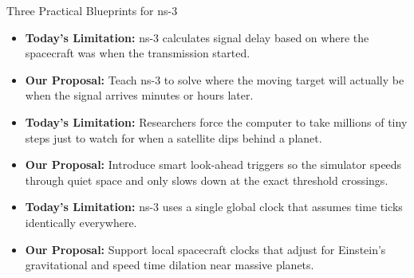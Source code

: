 \documentclass[aspectratio=169,10pt]{beamer}
\begin{document}
\begin{frame}{Three Practical Blueprints for ns-3}
  \begin{tcolorbox}[colback=cardBg,colframe=spaceNavy,title=\textbf{Blueprint 1: Aim Where the Spacecraft Will Be (In-Flight Light Solver)},top=1.5pt,bottom=1.5pt]
    \small
    \begin{itemize}\setlength{\itemsep}{0.8pt}
      \item \textbf{Today's Limitation:} ns-3 calculates signal delay based on where the spacecraft was when the transmission started.
      \item \textbf{Our Proposal:} Teach ns-3 to solve where the moving target will actually be when the signal arrives minutes or hours later.
    \end{itemize}
  \end{tcolorbox}

  \vspace{1.5pt}
  \begin{tcolorbox}[colback=lightCyan,colframe=electricCyan!80!black,title=\textbf{Blueprint 2: Smart Early-Warning Alarms (Boundary Event Guarding)},top=1.5pt,bottom=1.5pt]
    \small
    \begin{itemize}\setlength{\itemsep}{0.8pt}
      \item \textbf{Today's Limitation:} Researchers force the computer to take millions of tiny steps just to watch for when a satellite dips behind a planet.
      \item \textbf{Our Proposal:} Introduce smart look-ahead triggers so the simulator speeds through quiet space and only slows down at the exact threshold crossings.
    \end{itemize}
  \end{tcolorbox}

  \vspace{1.5pt}
  \begin{tcolorbox}[colback=lightGold,colframe=goldAccent,title=\textbf{Blueprint 3: Deep-Space Multi-Clock Synchronization},top=1.5pt,bottom=1.5pt]
    \small
    \begin{itemize}\setlength{\itemsep}{0.8pt}
      \item \textbf{Today's Limitation:} ns-3 uses a single global clock that assumes time ticks identically everywhere.
      \item \textbf{Our Proposal:} Support local spacecraft clocks that adjust for Einstein's gravitational and speed time dilation near massive planets.
    \end{itemize}
  \end{tcolorbox}
\end{frame}
\end{document}
